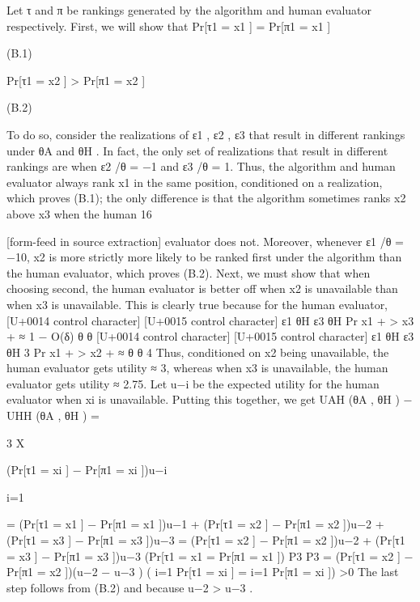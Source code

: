 \documentclass[10pt]{article}
\begin{document}
\begin{ReviewVerbatim}
Let τ and π be rankings generated by the algorithm and human evaluator respectively. First, we will
show that
Pr[τ1 = x1 ] = Pr[π1 = x1 ]

(B.1)

Pr[τ1 = x2 ] > Pr[π1 = x2 ]

(B.2)

To do so, consider the realizations of ε1 , ε2 , ε3 that result in different rankings under θA and θH . In fact,
the only set of realizations that result in different rankings are when ε2 /θ = −1 and ε3 /θ = 1. Thus,
the algorithm and human evaluator always rank x1 in the same position, conditioned on a realization,
which proves (B.1); the only difference is that the algorithm sometimes ranks x2 above x3 when the human
16


[form-feed in source extraction]
evaluator does not. Moreover, whenever ε1 /θ = −10, x2 is more strictly more likely to be ranked first under
the algorithm than the human evaluator, which proves (B.2).
Next, we must show that when choosing second, the human evaluator is better off when x2 is unavailable
than when x3 is unavailable. This is clearly true because for the human evaluator,
[U+0014 control character]
[U+0015 control character]
ε1 θH
ε3 θH
Pr x1 +
> x3 +
≈ 1 − O(δ)
θ
θ
[U+0014 control character]
[U+0015 control character]
ε1 θH
ε3 θH
3
Pr x1 +
> x2 +
≈
θ
θ
4
Thus, conditioned on x2 being unavailable, the human evaluator gets utility ≈ 3, whereas when x3 is
unavailable, the human evaluator gets utility ≈ 2.75. Let u−i be the expected utility for the human evaluator
when xi is unavailable. Putting this together, we get
UAH (θA , θH ) − UHH (θA , θH )
=

3
X

(Pr[τ1 = xi ] − Pr[π1 = xi ])u−i

i=1

= (Pr[τ1 = x1 ] − Pr[π1 = x1 ])u−1 + (Pr[τ1 = x2 ] − Pr[π1 = x2 ])u−2 + (Pr[τ1 = x3 ] − Pr[π1 = x3 ])u−3
= (Pr[τ1 = x2 ] − Pr[π1 = x2 ])u−2 + (Pr[τ1 = x3 ] − Pr[π1 = x3 ])u−3
(Pr[τ1 = x1 = Pr[π1 = x1 ])
P3
P3
= (Pr[τ1 = x2 ] − Pr[π1 = x2 ])(u−2 − u−3 )
( i=1 Pr[τ1 = xi ] = i=1 Pr[π1 = xi ])
>0
The last step follows from (B.2) and because u−2 > u−3 .
\end{ReviewVerbatim}
\end{document}
